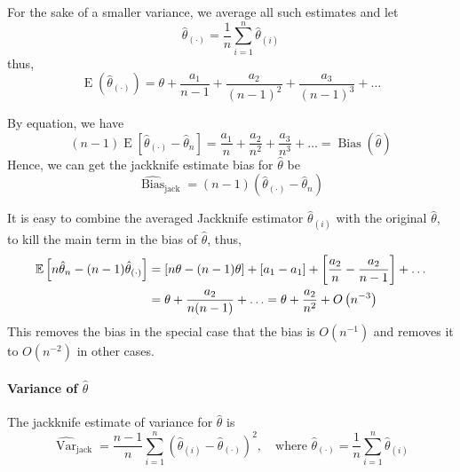 For the sake of a smaller variance, we average all such estimates and let
\begin{equation}
	\hat{\theta}_{(\cdot)}=\frac{1}{n}\sum_{i=1}^{n}\hat{\theta}_{(i)}
\end{equation}
thus,
\begin{equation}
	\operatorname{E}(\hat{\theta}_{(\cdot)})=\theta+\frac{a_{1}}{n-1}+\frac{a_{2}}{\left(n-1\right)^{2}}+\frac{a_{3}}{\left(n-1\right)^{3}}+\ldots
\end{equation}

By equation, we have
\begin{equation}
	(n-1)\operatorname{E}\left[\hat{\theta}_{(\cdot)}-\hat{\theta}_{n}\right]=\frac{a_{1}}{n}+\frac{a_{2}}{n^{2}}+\frac{a_{3}}{n^{3}}+\ldots=\operatorname{Bias}(\hat{\theta})
\end{equation}
Hence, we can get the jackknife estimate bias for $\hat{\theta}$ be
\begin{equation}
	\widehat{\operatorname{Bias}}_{\text{jack}}=(n-1)\left(\hat{\theta}_{(\cdot)}-\hat{\theta}_{n}\right)
\end{equation}


\begin{remark}
	It is easy to combine the averaged Jackknife estimator $\hat{\theta}_{(i)}$ with the original $\hat{\theta}$, to kill the main term in the bias of $\hat{\theta}$, thus,
	\begin{equation}
		\begin{aligned}
			{\mathbb E}\left[n\hat{\theta}_{n}-(n-1)\hat{\theta}_{(\cdot)}\right] & =\left[n\theta-(n-1)\theta\right]+\left[a_{1}-a_{1}\right]+\left[\frac{a_{2}}{n}-\frac{a_{2}}{n-1}\right]+\ldots \\
			                                                               & =\theta+\frac{a_{2}}{n(n-1)}+\ldots=\theta+\frac{a_{2}}{n^{2}}+O\left(n^{-3}\right)
		\end{aligned}
	\end{equation}
	This removes the bias in the special case that the bias is $O\left(n^{-1}\right)$ and removes it to $O\left(n^{-2}\right)$ in other cases.
\end{remark}

\paragraph{Variance of $\hat{\theta}$}

The jackknife estimate of variance for $\hat{\theta}$ is
\begin{equation}
	\widehat{\operatorname{Var}}_{\text{jack}}=\frac{n-1}{n}\sum_{i=1}^{n}\left(\hat{\theta}_{(i)}-\hat{\theta}_{(\cdot)}\right)^{2},\quad\text{where }\hat{\theta}_{(\cdot)}=\frac{1}{n}\sum_{i=1}^{n}\hat{\theta}_{(i)}
\end{equation}


